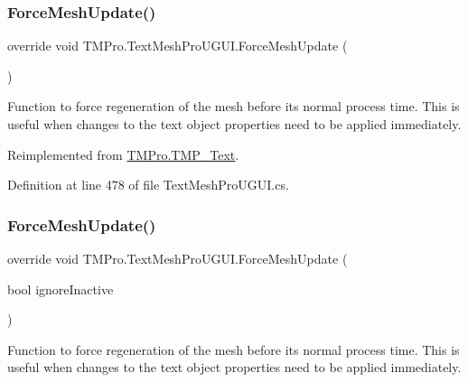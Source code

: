 \subsubsection{\texorpdfstring{ForceMeshUpdate()}{ForceMeshUpdate()}\hspace{0.1cm}{\footnotesize\ttfamily [1/2]}}
{\footnotesize\ttfamily override void T\+M\+Pro.\+Text\+Mesh\+Pro\+U\+G\+U\+I.\+Force\+Mesh\+Update (\begin{DoxyParamCaption}{ }\end{DoxyParamCaption})\hspace{0.3cm}{\ttfamily [virtual]}}



Function to force regeneration of the mesh before its normal process time. This is useful when changes to the text object properties need to be applied immediately. 



Reimplemented from \mbox{\hyperlink{class_t_m_pro_1_1_t_m_p___text_a93c463ff2bb3b846a468f3d1764bdef4}{T\+M\+Pro.\+T\+M\+P\+\_\+\+Text}}.



Definition at line 478 of file Text\+Mesh\+Pro\+U\+G\+U\+I.\+cs.

\mbox{\label{class_t_m_pro_1_1_text_mesh_pro_u_g_u_i_aab2c39e0fc65227e83401eeac525f010}} 
\subsubsection{\texorpdfstring{ForceMeshUpdate()}{ForceMeshUpdate()}\hspace{0.1cm}{\footnotesize\ttfamily [2/2]}}
{\footnotesize\ttfamily override void T\+M\+Pro.\+Text\+Mesh\+Pro\+U\+G\+U\+I.\+Force\+Mesh\+Update (\begin{DoxyParamCaption}\item[{bool}]{ignore\+Inactive }\end{DoxyParamCaption})\hspace{0.3cm}{\ttfamily [virtual]}}



Function to force regeneration of the mesh before its normal process time. This is useful when changes to the text object properties need to be applied immediately. 


